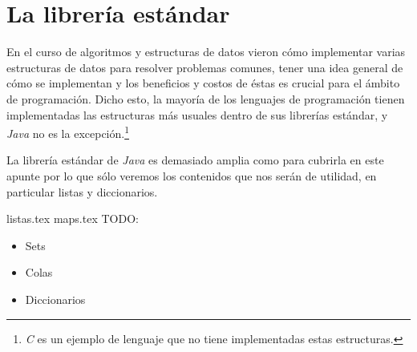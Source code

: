 \section{La librería estándar}
  En el curso de algoritmos y estructuras de datos vieron cómo implementar varias estructuras de 
  datos para resolver problemas comunes, tener una idea general de cómo se implementan y los 
  beneficios y costos de éstas es crucial para el ámbito de programación.
  Dicho esto, la mayoría de los lenguajes de programación tienen implementadas las estructuras más
  usuales dentro de sus librerías estándar, y \textit{Java} no es la excepción.\footnote{\textit{C} 
  es un ejemplo de lenguaje que no tiene implementadas estas estructuras.}

  La librería estándar de \textit{Java} es demasiado amplia como para cubrirla en este apunte por lo
  que sólo veremos los contenidos que nos serán de utilidad, en particular listas y diccionarios.
  
  {listas.tex}
  {maps.tex}
  TODO:
  \begin{itemize}
    \item Sets
    \item Colas
    \item Diccionarios
  \end{itemize}
